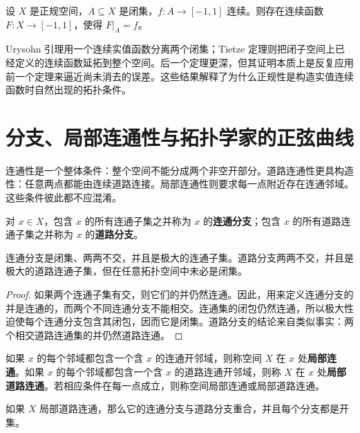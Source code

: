 \begin{theorem}
设 $X$ 是正规空间，$A\subseteq X$ 是闭集，$f:A\to[-1,1]$ 连续。则存在连续函数 $F:X\to[-1,1]$，使得 $F|_A=f$。
\end{theorem}

\begin{remark}
Urysohn 引理用一个连续实值函数分离两个闭集；Tietze 定理则把闭子空间上已经定义的连续函数延拓到整个空间。后一个定理更深，但其证明本质上是反复应用前一个定理来逼近尚未消去的误差。这些结果解释了为什么正规性是构造实值连续函数时自然出现的拓扑条件。
\end{remark}

\section{分支、局部连通性与拓扑学家的正弦曲线}

连通性是一个整体条件：整个空间不能分成两个非空开部分。道路连通性更具构造性：任意两点都能由连续道路连接。局部连通性则要求每一点附近存在连通邻域。这些条件彼此都不应混淆。

\begin{definition}[连通分支与道路分支]
对 $x\in X$，包含 $x$ 的所有连通子集之并称为 $x$ 的\textbf{连通分支}；包含 $x$ 的所有道路连通子集之并称为 $x$ 的\textbf{道路分支}。
\end{definition}

\begin{proposition}
连通分支是闭集、两两不交，并且是极大的连通子集。道路分支两两不交，并且是极大的道路连通子集，但在任意拓扑空间中未必是闭集。
\end{proposition}

\begin{proof}
如果两个连通子集有交，则它们的并仍然连通。因此，用来定义连通分支的并是连通的，而两个不同连通分支不能相交。连通集的闭包仍然连通，所以极大性迫使每个连通分支包含其闭包，因而它是闭集。道路分支的结论来自类似事实：两个相交道路连通集的并仍然道路连通。
\end{proof}

\begin{definition}[局部连通性]
如果 $x$ 的每个邻域都包含一个含 $x$ 的连通开邻域，则称空间 $X$ 在 $x$ 处\textbf{局部连通}。如果 $x$ 的每个邻域都包含一个含 $x$ 的道路连通开邻域，则称 $X$ 在 $x$ 处\textbf{局部道路连通}。若相应条件在每一点成立，则称空间局部连通或局部道路连通。
\end{definition}

\begin{theorem}
如果 $X$ 局部道路连通，那么它的连通分支与道路分支重合，并且每个分支都是开集。
\end{theorem}

